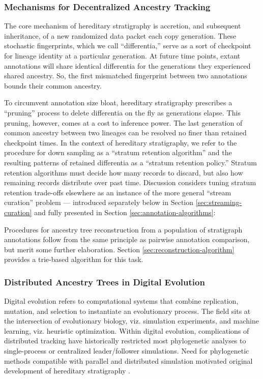 \subsubsection{Mechanisms for Decentralized Ancestry Tracking}

The core mechanism of hereditary stratigraphy is accretion, and subsequent inheritance, of a new randomized data packet each copy generation.
These stochastic fingerprints, which we call ``differentia,'' serve as a sort of checkpoint for lineage identity at a particular generation.
At future time points, extant annotations will share identical differentia for the generations they experienced shared ancestry.
So, the first mismatched fingerprint between two annotations bounds their common ancestry.

To circumvent annotation size bloat, hereditary stratigraphy prescribes a ``pruning'' process to delete differentia on the fly as generations elapse.
This pruning, however, comes at a cost to inference power.
The last generation of common ancestry between two lineages can be resolved no finer than retained checkpoint times.
In the context of hereditary stratigraphy, we refer to the procedure for down sampling as a ``stratum retention algorithm'' and the resulting patterns of retained differentia as a ``stratum retention policy.''
Stratum retention algorithms must decide how many records to discard, but also how remaining records distribute over past time.
Discussion considers tuning stratum retention trade-offs elsewhere as an instance of the more general ``stream curation'' problem --- introduced separately below in Section \ref{sec:streaming-curation} and fully presented in Section \ref{sec:annotation-algorithms}:

Procedures for ancestry tree reconstruction from a population of stratigraph annotations follow from the same principle as pairwise annotation comparison, but merit some further elaboration.
Section \ref{sec:reconstruction-algorithm} provides a trie-based algorithm for this task.

\subsubsection{Distributed Ancestry Trees in Digital Evolution}

Digital evolution refers to computational systems that combine replication, mutation, and selection to instantiate an evolutionary process.
The field sits at the intersection of evolutionary biology, viz. simulation experiments, and machine learning, viz. heuristic optimization.
Within digital evolution, complications of distributed tracking have historically restricted most phylogenetic analyses to single-process or centralized leader/follower simulations.
Need for phylogenetic methods compatible with parallel and distributed simulation motivated original development of hereditary stratigraphy \citep{moreno2022hereditary}.

